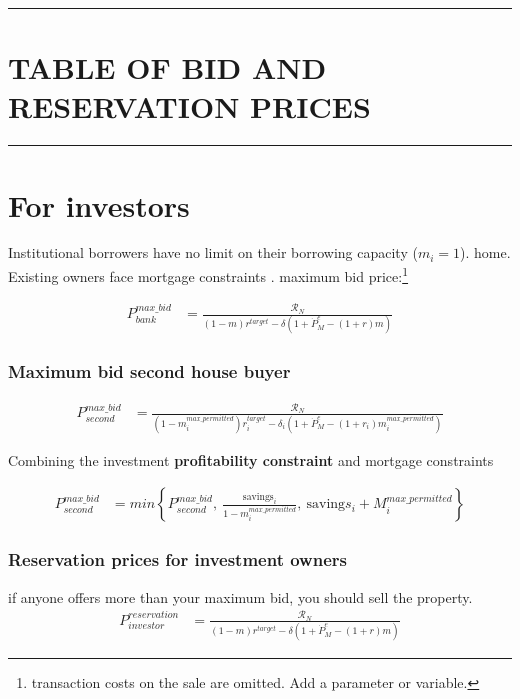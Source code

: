 \newpage\hrule
\section{TABLE OF BID AND RESERVATION PRICES}
\hrule




\section{For investors}
 Institutional borrowers have no limit on their borrowing capacity ($m_i=1$). home. Existing owners face mortgage constraints .
maximum bid price:\footnote{transaction costs on the sale are omitted. Add a parameter or variable.}

\begin{eqnarray}\label{eqn-max-investment-bid}
P_{bank}^{max\_bid} & = \frac{\mathcal{R}_N}{(1-m)r^{target}-\delta \left(1 + \dot P_M^e - (1+r)m\right)} 
\end{eqnarray}


\subsubsection{Maximum bid second house buyer}

 \begin{eqnarray}\label{eqn-max-second-bid}
P_{second}^{max\_bid} & = \frac{\mathcal{R}_N}{(1-m_i^{max\_permitted})r_i^{target}-\delta_i \left(1 + \dot P_M^e - (1+r_i)m_i^{max\_permitted}\right)}  \nonumber
\end{eqnarray}

Combining the investment \textbf{profitability constraint} and mortgage constraints

\begin{eqnarray}
P_{second}^{max\_bid} & = min \left\{P_{second}^{max\_bid},\ \frac{\mathrm{savings}_i}{1-m_i^{max\_permitted}},\ \mathrm{saving}s_i + M_i^{max\_permitted}  \right\}  \nonumber
\end{eqnarray}

\subsubsection{Reservation prices for investment owners}
 if anyone offers more than your maximum bid, you should sell the property. 
\begin{eqnarray}
P_{investor}^{reservation} & =    \frac{\mathcal{R}_N}{(1-m)r^{target}-\delta \left(1 + \dot P_M^e - (1+r)m\right)}  \nonumber\end{eqnarray}


